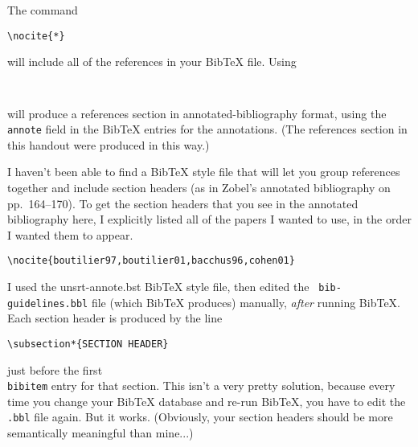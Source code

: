 \documentclass{article}
\begin{document}
The command
\begin{verbatim}
\nocite{*}
\end{verbatim}
will include all of the references in your BibTeX file.  Using
\begin{verbatim}


\end{verbatim}
will produce a references section in annotated-bibliography format,
using the {\tt annote} field in the BibTeX entries for the
annotations.  (The references section in this handout were produced in
this way.)

I haven't been able to find a BibTeX style file that will let you
group references together and include section headers (as in Zobel's
annotated bibliography on pp.~164--170).  To get the section headers
that you see in the annotated bibliography here, I explicitly listed
all of the papers I wanted to use, in the order I wanted them to
appear.
\begin{verbatim}
\nocite{boutilier97,boutilier01,bacchus96,cohen01}
\end{verbatim}
I used the
{unsrt-annote.bst} BibTeX style file, then edited the {\tt
bib-guidelines.bbl} file (which BibTeX produces) manually, {\em after}
running BibTeX.  Each section header is produced by the line
\begin{verbatim}
\subsection*{SECTION HEADER}
\end{verbatim}
just before the first {\tt \\bibitem} entry for that section.
This isn't a very pretty solution, because every time you change your
BibTeX database and re-run BibTeX, you have to edit the {\tt .bbl}
file again.  But it works.  (Obviously, your section headers should be
more semantically meaningful than mine...)


\nocite{boutilier97,boutilier01,bacchus96,cohen01}



\end{document}

